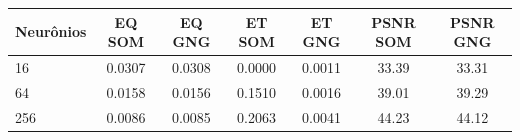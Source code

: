 \begin{tabular}{lcccccc}
\toprule
Neurônios & EQ SOM & EQ GNG & ET SOM & ET GNG & PSNR SOM & PSNR GNG\\
\midrule
16 & 0.0307 & 0.0308 & 0.0000 & 0.0011 & 33.39 & 33.31\\
64 & 0.0158 & 0.0156 & 0.1510 & 0.0016 & 39.01 & 39.29\\
256 & 0.0086 & 0.0085 & 0.2063 & 0.0041 & 44.23 & 44.12\\
\bottomrule
\end{tabular}
